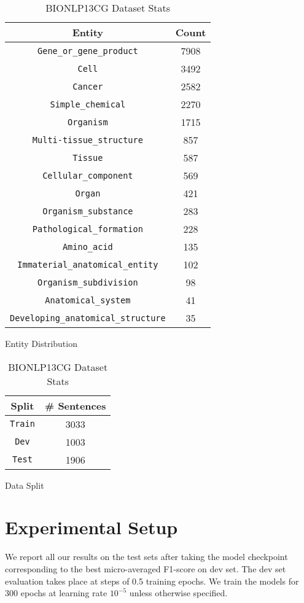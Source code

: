 \begin{table}[h!]
\begin{subtable}[t]{.48\linewidth}
\centering
\begin{tabular}{|c|c|}\hline
	\textbf{Entity} & \textbf{Count}\\\hline
	\texttt{Gene\_or\_gene\_product} & 7908\\\hline
    \texttt{Cell} & 3492\\\hline
    \texttt{Cancer} & 2582\\\hline
    \texttt{Simple\_chemical} & 2270\\\hline
    \texttt{Organism} & 1715\\\hline
    \texttt{Multi-tissue\_structure} & 857\\\hline
    \texttt{Tissue} & 587\\\hline
    \texttt{Cellular\_component} & 569\\\hline
    \texttt{Organ} & 421\\\hline
    \texttt{Organism\_substance} & 283\\\hline
    \texttt{Pathological\_formation} & 228\\\hline
    \texttt{Amino\_acid} & 135\\\hline
    \texttt{Immaterial\_anatomical\_entity} & 102\\\hline
    \texttt{Organism\_subdivision} & 98\\\hline
    \texttt{Anatomical\_system} & 41\\\hline
    \texttt{Developing\_anatomical\_structure} & 35\\\hline
	\end{tabular}
	\caption{Entity Distribution}
	\label{tab:bio_entity_distribution}
\end{subtable}
\begin{subtable}[t]{.48\linewidth}
\centering
\begin{tabular}{|c|c|}\hline
	\textbf{Split} & \textbf{\# Sentences}\\\hline
	\texttt{Train} & 3033\\\hline
	\texttt{Dev} & 1003\\\hline
	\texttt{Test} & 1906\\\hline
	\end{tabular}
	\caption{Data Split}
	\label{tab:bio_dataset_split}
\end{subtable}
\caption{BIONLP13CG Dataset Stats}
\end{table}

\section{Experimental Setup}
We report all our results on the test sets after taking the model checkpoint corresponding to the best micro-averaged F1-score on dev set. The dev set evaluation takes place at steps of 0.5 training epochs. We train the models for $300$ epochs at learning rate $10^{-5}$ unless otherwise specified. 

